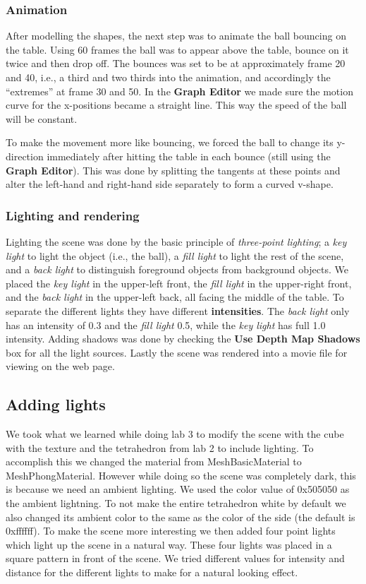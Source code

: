 \documentclass[a4paper]{article}
\begin{document}
\subsubsection{Animation}

After modelling the shapes, the next step was to animate the ball bouncing on
the table. Using 60 frames the ball was to appear above the table, bounce on it
twice and then drop off. The bounces was set to be at approximately frame 20
and 40, i.e., a third and two thirds into the animation, and accordingly the
``extremes'' at frame 30 and 50. In the \textbf{Graph Editor} we made sure the
motion curve for the x-positions became a straight line. This way the speed of
the ball will be constant.

To make the movement more like bouncing, we forced
the ball to change its y-direction immediately after hitting the table in each
bounce (still using the \textbf{Graph Editor}). This was done by splitting the
tangents at these points and alter the left-hand and right-hand side separately
to form a curved v-shape.

\subsubsection{Lighting and rendering}

Lighting the scene was done by the basic principle of \textit{three-point
lighting}; a \textit{key light} to light the object (i.e., the ball), a
\textit{fill light} to light the rest of the scene, and a \textit{back light} to
distinguish foreground objects from background objects. We placed the
\textit{key light} in the upper-left front, the \textit{fill light} in the
upper-right front, and the \textit{back light} in the upper-left back, all
facing the middle of the table. To separate the different lights they have
different \textbf{intensities}. The \textit{back light} only has an intensity of
0.3 and the \textit{fill light} 0.5, while the \textit{key light} has full 1.0
intensity. Adding shadows was done by checking the \textbf{Use Depth Map
Shadows} box for all the light sources. Lastly the scene was rendered into a
movie file for viewing on the web page.

\subsection{Adding lights} %

We took what we learned while doing lab 3 to modify the scene with the cube with
the texture and the tetrahedron from lab 2 to include lighting. To accomplish
this we changed the material from MeshBasicMaterial to MeshPhongMaterial.
However while doing so the scene was completely dark, this is because we need an
ambient lighting. We used the color value of 0x505050 as the ambient lightning.
To not make the entire tetrahedron white by default we also changed its ambient
color to the same as the color of the side (the default is 0xffffff). To make
the scene more interesting we then added four point lights which light up the
scene in a natural way. These four lights was placed in a square pattern in
front of the scene. We tried different values for intensity and distance for the
different lights to make for a natural looking effect.
\end{document}

